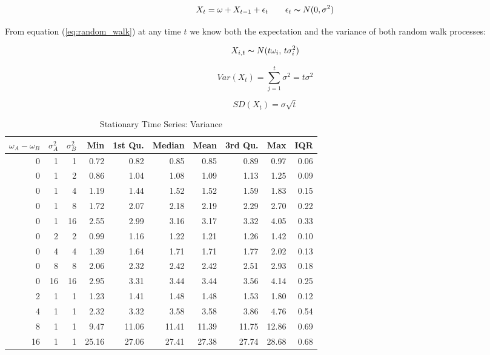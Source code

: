 \documentclass[12pt]{article}
\begin{document}
\begin{equation} \label{eq:random_walk}
    X_{t} = \omega + X_{t-1} + \epsilon_{t} \qquad \epsilon_{t} \thicksim N(0, \sigma^{2})
\end{equation}

From equation (\ref{eq:random_walk}) at any time $t$ we know both the expectation and the variance of both random walk processes:

\begin{equation}
    X_{i,t} \thicksim N(t\omega_{i}, \, t\sigma_{i}^{2})
\end{equation}

\begin{equation}
    Var(X_t) = \sum_{j=1}^t \sigma^2=t \sigma^2
\end{equation}

\begin{equation}
    SD(X_t) = \sigma \sqrt{t}
\end{equation}


\begin{table}
    \begin{center}
      \begin{tabular}{| r r r | r r r r r r r |}
        \hline
        $\omega_{A} - \omega_{B}$ & $\sigma^{2}_{A}$ & $\sigma^{2}_{B}$ & Min & 1st Qu. & Median & Mean & 3rd Qu. & Max & IQR \\
        \hline
        0  & 1  & 1  & 0.72  & 0.82  & 0.85  & 0.85  & 0.89  & 0.97  & 0.06 \\
        \hline
        0  & 1  & 2  & 0.86  & 1.04  & 1.08  & 1.09  & 1.13  & 1.25  & 0.09 \\
        0  & 1  & 4  & 1.19  & 1.44  & 1.52  & 1.52  & 1.59  & 1.83  & 0.15 \\
        0  & 1  & 8  & 1.72  & 2.07  & 2.18  & 2.19  & 2.29  & 2.70  & 0.22 \\
        0  & 1  & 16 & 2.55  & 2.99  & 3.16  & 3.17  & 3.32  & 4.05  & 0.33 \\
        \hline
        0  & 2  & 2  & 0.99  & 1.16  & 1.22  & 1.21  & 1.26  & 1.42  & 0.10 \\
        0  & 4  & 4  & 1.39  & 1.64  & 1.71  & 1.71  & 1.77  & 2.02  & 0.13 \\
        0  & 8  & 8  & 2.06  & 2.32  & 2.42  & 2.42  & 2.51  & 2.93  & 0.18 \\
        0  & 16 & 16 & 2.95  & 3.31  & 3.44  & 3.44  & 3.56  & 4.14  & 0.25 \\
        \hline
        2  & 1  & 1  &  1.23 &  1.41 &  1.48 &  1.48 &  1.53 &  1.80 & 0.12 \\
        4  & 1  & 1  &  2.32 &  3.32 &  3.58 &  3.58 &  3.86 &  4.76 & 0.54 \\
        8  & 1  & 1  &  9.47 & 11.06 & 11.41 & 11.39 & 11.75 & 12.86 & 0.69 \\
        16 & 1  & 1  & 25.16 & 27.06 & 27.41 & 27.38 & 27.74 & 28.68 & 0.68 \\
        \hline
      \end{tabular}
    \caption{Stationary Time Series: Variance}
    \end{center}
\end{table}
\end{document}

